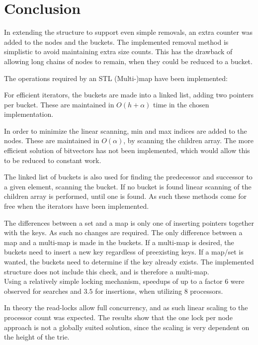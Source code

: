 \chapter{Conclusion}

In extending the structure to support even simple removals, an extra counter
was added to the nodes and the buckets. The implemented removal method
is simplistic to avoid maintaining extra size counts. This has the drawback of
allowing long chains of nodes to remain, when they could be reduced to a bucket.

The operations required by an STL {\keyword (Multi-)map} have been implemented:

For efficient iterators, the buckets are made into a linked list, adding two
pointers per bucket. These are maintained in $O(h+\alpha)$ time in the chosen
implementation.

In order to minimize the linear scanning, {\keyword min} and {\keyword max}
indices are added to the nodes. These are maintained in $O(\alpha)$, by
scanning the children array. The more efficient solution of bitvectors has not
been implemented, which would allow this to be reduced to constant work.

The linked list of buckets is also used for finding the predecessor and
successor to a given element, scanning the bucket. If no bucket is found
linear scanning of the children array is performed, until one is found.
As such these methods come for free when the iterators have been implemented.

The differences between a set and a map is only one of inserting pointers together
with the keys. As such no changes are required. The only difference between a
map and a multi-map is made in the buckets. If a multi-map is desired, the
buckets need to insert a new key regardless of preexisting keys. If a map/set is
wanted, the buckets need to determine if the key already exists.
The implemented structure does not include this check, and is therefore
a multi-map.
\\

Using a relatively simple locking mechanism, speedups of up to a factor $6$
were observed for searches and $3.5$ for insertions, when utilizing 8
processors.

In theory the read-locks allow full concurrency, and as such linear scaling to the
processor count was expected. The results show that the one lock per node
approach is not a globally suited solution, since the scaling is very dependent
on the height of the trie.

